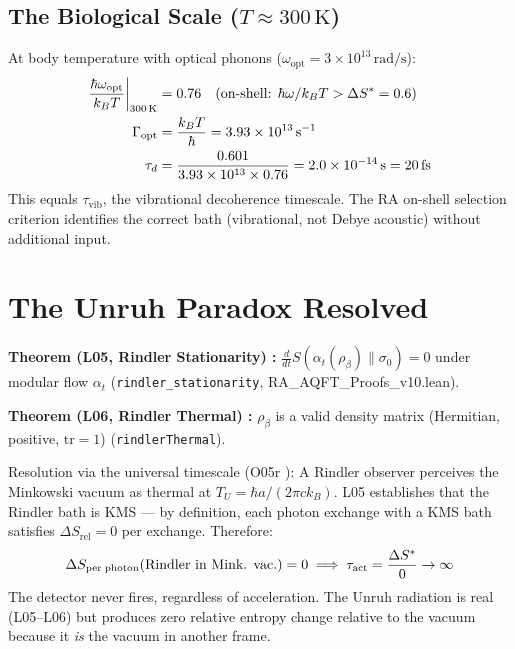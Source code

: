 \documentclass[12pt,a4paper]{article}
\begin{document}
\subsection{The Biological Scale ($T\approx 300\,\mathrm{K}$)}

At body temperature with optical phonons ($\omega_{\mathrm{opt}} = 3\times10^{13}\,\mathrm{rad/s}$):
\begin{align}
  \frac{\hbar\omega_{\mathrm{opt}}}{k_BT}\biggr|_{300\,\mathrm{K}} &= 0.76 \quad\text{(on-shell: }{\hbar\omega}/{k_BT} > \Delta S^* = 0.6) \\
  \Gamma_{\mathrm{opt}} &= \frac{k_BT}{\hbar} = 3.93\times10^{13}\,\mathrm{s}^{-1} \\
  \tau_d &= \frac{0.601}{3.93\times10^{13}\times 0.76} = 2.0\times10^{-14}\,\mathrm{s} = 20\,\mathrm{fs}
  \label{eq:bio}
\end{align}
This equals $\tau_{\mathrm{vib}}$, the vibrational decoherence timescale.  The RA on-shell selection criterion identifies the correct bath (vibrational, not Debye acoustic) without additional input.

\section{The Unruh Paradox Resolved}\label{sec:unruh}

\begin{leanbox}
\textbf{Theorem (L05, Rindler Stationarity) \statusLV:} $\frac{d}{dt}S(\alpha_t(\rho_\beta)\|\sigma_0) = 0$ under modular flow $\alpha_t$ (\texttt{rindler\_stationarity}, RA\_AQFT\_Proofs\_v10.lean).

\textbf{Theorem (L06, Rindler Thermal) \statusLV:} $\rho_\beta$ is a valid density matrix (Hermitian, positive, $\mathrm{tr}=1$) (\texttt{rindlerThermal}).
\end{leanbox}

Resolution via the universal timescale (O05r \statusDR): A Rindler observer perceives the Minkowski vacuum as thermal at $T_U = \hbar a/(2\pi c k_B)$.  L05 establishes that the Rindler bath is KMS — by definition, each photon exchange with a KMS bath satisfies $\Delta S_{\mathrm{rel}} = 0$ per exchange.  Therefore:
\begin{equation}
  \Delta S_{\mathrm{per\;photon}}(\text{Rindler in Mink. vac.}) = 0 \implies \tau_{\mathrm{act}} = \frac{\Delta S^*}{0} \to \infty
\end{equation}
The detector never fires, regardless of acceleration.  The Unruh radiation is real (L05--L06) but produces zero relative entropy change relative to the vacuum because it \emph{is} the vacuum in another frame.
\end{document}
